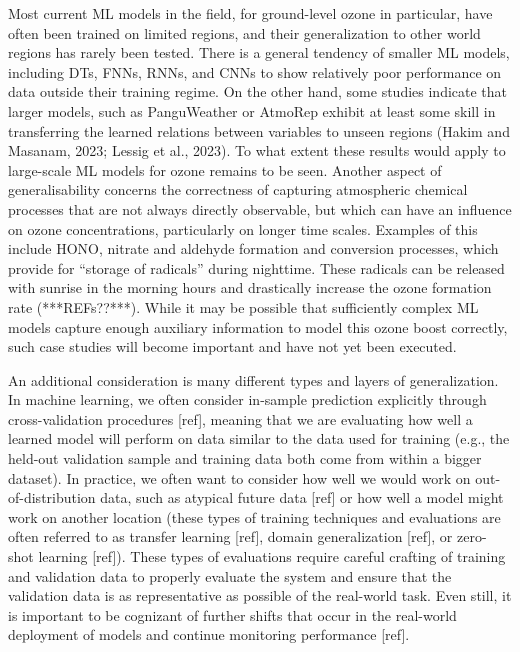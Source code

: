 \documentclass[gmd, manuscript]{copernicus}
\begin{document}
Most current ML models in the field, for ground-level ozone in particular, have often been trained on limited regions, and their generalization to other world regions has rarely been tested. There is a general tendency of smaller ML models, including DTs, FNNs, RNNs, and CNNs to show relatively poor performance on data outside their training regime. On the other hand, some studies indicate that larger models, such as PanguWeather or AtmoRep exhibit at least some skill in transferring the learned relations between variables to unseen regions (Hakim and Masanam, 2023; Lessig et al., 2023). To what extent these results would apply to large-scale ML models for ozone remains to be seen. Another aspect of generalisability concerns the correctness of capturing atmospheric chemical processes that are not always directly observable, but which can have an influence on ozone concentrations, particularly on longer time scales. Examples of this include HONO, nitrate and aldehyde formation and conversion processes, which provide for “storage of radicals” during nighttime. These radicals can be released with sunrise in the morning hours and drastically increase the ozone formation rate (***REFs??***). While it may be possible that sufficiently complex ML models capture enough auxiliary information to model this ozone boost correctly, such case studies will become important and have not yet been executed. 

An additional consideration is many different types and layers of generalization. In machine learning, we often consider in-sample prediction explicitly through cross-validation procedures [ref], meaning that we are evaluating how well a learned model will perform on data similar to the data used for training (e.g., the held-out validation sample and training data both come from within a bigger dataset). In practice, we often want to consider how well we would work on out-of-distribution data, such as atypical future data [ref] or how well a model might work on another location (these types of training techniques and evaluations are often referred to as transfer learning [ref], domain generalization [ref], or zero-shot learning [ref]). These types of evaluations require careful crafting of training and validation data to properly evaluate the system and ensure that the validation data is as representative as possible of the real-world task. Even still, it is important to be cognizant of further shifts that occur in the real-world deployment of models and continue monitoring performance [ref].
 
\end{document}
